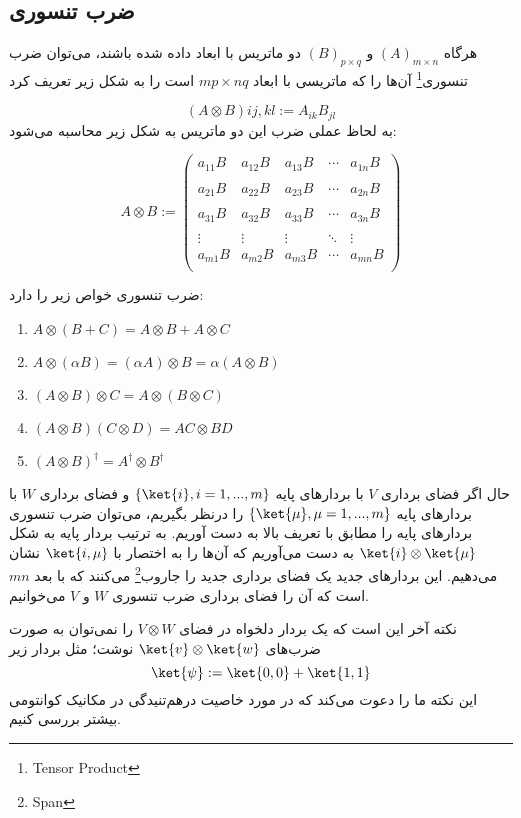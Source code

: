  \subsection{ضرب تنسوری}
 هرگاه $(A)_{m \times n}$ و $(B)_{p \times q}$ دو ماتریس با ابعاد داده شده باشند، می‌توان ضرب تنسوری‌\footnote{Tensor Product} آن‌ها را که ماتریسی با ابعاد $mp \times nq$ است را به شکل زیر تعریف کرد
 
 \begin{equation}
 	(A \otimes B)ij,kl := A_{ik}B_{jl}
 \end{equation}
 به لحاظ عملی ضرب این دو ماتریس به شکل زیر محاسبه می‌شود:
 
\begin{equation}
 A \otimes B := \begin{pmatrix}
 		a_{11}B & a_{12}B & a_{13}B & \cdots & a_{1n}B \\ 
 		\\
 		a_{21}B & a_{22}B & a_{23}B & \cdots & a_{2n}B \\ 
 		\\
 		a_{31}B & a_{32}B & a_{33}B & \cdots & a_{3n}B \\ 
 		\\
 		\vdots & \vdots & \vdots & \ddots & \vdots
		\\
 		a_{m1}B & a_{m2}B & a_{m3}B & \cdots & a_{mn}B \\ 

 	\end{pmatrix}
 \end{equation} 

 	
 	ضرب تنسوری خواص زیر را دارد:
 	
 	\begin{enumerate}
 		\item $A \otimes (B + C) = A \otimes B + A \otimes C$
 		\item $A \otimes (\alpha B) = (\alpha A) \otimes B = \alpha (A \otimes B)$
 		\item $(A \otimes B) \otimes C = A \otimes ( B \otimes C)$
 		\item $(A \otimes B)(C \otimes D) = AC \otimes BD$
 		\item $(A \otimes B)^{\dagger} = A^{\dagger} \otimes B^{\dagger}$
 	\end{enumerate}
 	حال اگر فضای برداری $V$  با بردارهای پایه  $\{\ket{i}, i = 1, ..., m\}$ و فضای برداری $W$ با بردارهای پایه $\{\ket{\mu}, \mu = 1, ..., m\}$ را درنظر بگیریم، می‌توان ضرب تنسوری بردارهای پایه را مطابق با تعریف بالا به دست آوریم. به ترتیب بردار پایه به شکل $\ket{i} \otimes \ket{\mu}$ به دست می‌آوریم که آن‌ها را به اختصار با $\ket{i,\mu}$ نشان می‌دهیم. این بردارهای جدید یک فضای برداری جدید را جاروب\footnote{Span} می‌کنند که با بعد $mn$ است که آن را فضای برداری ضرب تنسوری $W$ و $V$ می‌خوانیم. 


نکته‌ آخر این است که یک بردار دلخواه در فضای $V \otimes W$ را نمی‌توان به صورت ضرب‌های $\ket{v} \otimes \ket{w}$ نوشت؛ مثل بردار زیر
\begin{equation}
	\ket{\psi} := \ket{0,0} + \ket{1,1}
\end{equation}
	این نکته ما را دعوت می‌کند که در مورد خاصیت در‌هم‌تنیدگی در مکانیک کوانتومی بیشتر بررسی کنیم. 


